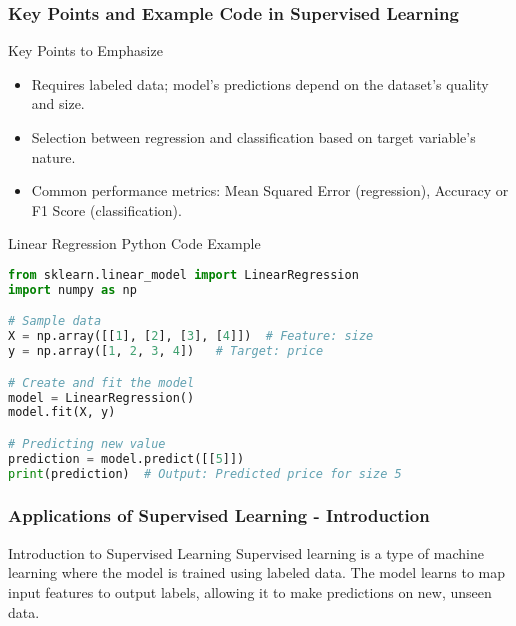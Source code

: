 \documentclass[aspectratio=169]{beamer}
\begin{document}
\begin{frame}[fragile]
  \frametitle{Key Points and Example Code in Supervised Learning}
  \begin{block}{Key Points to Emphasize}
    \begin{itemize}
      \item Requires labeled data; model's predictions depend on the dataset's quality and size.
      \item Selection between regression and classification based on target variable's nature.
      \item Common performance metrics: Mean Squared Error (regression), Accuracy or F1 Score (classification).
    \end{itemize}
  \end{block}

  \begin{block}{Linear Regression Python Code Example}
  \begin{lstlisting}[language=Python]
from sklearn.linear_model import LinearRegression
import numpy as np

# Sample data
X = np.array([[1], [2], [3], [4]])  # Feature: size
y = np.array([1, 2, 3, 4])   # Target: price

# Create and fit the model
model = LinearRegression()
model.fit(X, y)

# Predicting new value
prediction = model.predict([[5]])
print(prediction)  # Output: Predicted price for size 5
  \end{lstlisting}
  \end{block}
\end{frame}

\begin{frame}[fragile]
    \frametitle{Applications of Supervised Learning - Introduction}
    \begin{block}{Introduction to Supervised Learning}
        Supervised learning is a type of machine learning where the model is trained using labeled data. The model learns to map input features to output labels, allowing it to make predictions on new, unseen data.
    \end{block}
\end{frame}
\end{document}
